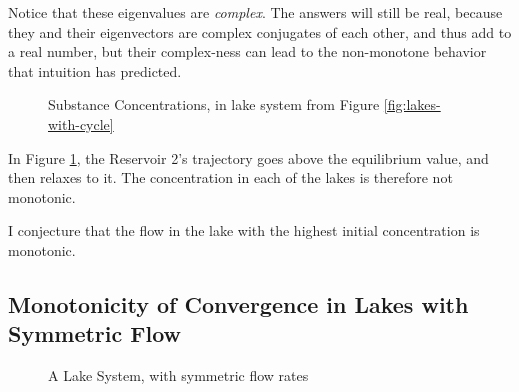 \documentclass{article}
\begin{document}
Notice that these eigenvalues are \emph{complex}.
The answers will still be real, because they and their eigenvectors are complex
	conjugates of each other, and thus add to a real number, but their complex-ness
	can lead to the non-monotone behavior that intuition has predicted.

\begin{figure}[h!]
\centering
{}
\caption{Substance Concentrations, in lake system from Figure \ref{fig:lakes-with-cycle}}
\label{fig:dynamics-with-cycle}
\end{figure}

In Figure \ref{fig:dynamics-with-cycle}, the Reservoir 2's trajectory goes above
	the equilibrium value, and then relaxes to it.
The concentration in each of the lakes is therefore not monotonic.

I conjecture that the flow in the lake with the highest initial concentration is monotonic.

\subsection{Monotonicity of Convergence in Lakes with Symmetric Flow}

\begin{figure}[h!]
\centering
{}
\caption{A Lake System, with symmetric flow rates}
\label{fig:lakes-symmetric}
\end{figure}
\end{document}
